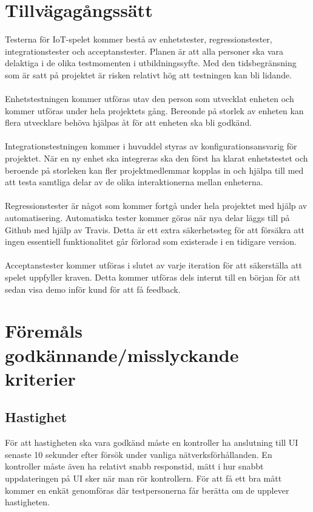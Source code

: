 \documentclass[10pt]{article}
\begin{document}
\section{Tillvägagångssätt}
	Testerna för IoT-spelet kommer bestå av enhetstester, regressionstester, integrationstester och acceptanstester. Planen är att alla personer ska vara delaktiga i de olika 		testmomenten i utbildningssyfte. Med den tidsbegränsning som är satt på projektet är risken relativt hög att testningen kan bli lidande. \\
	\\
	Enhetstestningen kommer utföras utav den person som utvecklat enheten och kommer utföras under hela projektets gång. Bereonde på storlek av enheten kan flera utvecklare behöva hjälpas åt för att enheten ska bli godkänd.\\
	\\
	Integrationstestningen kommer i huvuddel styras av konfigurationsansvarig för projektet. När en ny enhet ska integreras ska den först ha klarat enhetstestet och beroende på storleken kan fler projektmedlemmar kopplas in och hjälpa till med att testa samtliga delar av de olika interaktionerna mellan enheterna. \\
	\\
	Regressionstester är något som kommer fortgå under hela projektet med hjälp av automatisering. Automatiska tester kommer göras när nya delar läggs till på Github med hjälp av {\color{red}Travis}. Detta är ett extra säkerhetssteg för att försäkra att ingen essentiell funktionalitet går förlorad som existerade i en tidigare version.\\
	\\
	Acceptanstester kommer utföras i slutet av varje iteration för att säkerställa att spelet uppfyller kraven. Detta kommer utföras dels internt till en början för att sedan visa demo inför kund för att få feedback. 
	
	

\section{Föremåls godkännande/misslyckande kriterier}
	\subsection{Hastighet}
		För att hastigheten ska vara godkänd måste en kontroller ha anslutning till UI senaste 10 sekunder efter försök under vanliga nätverksförhållanden. En kontroller måste även ha relativt snabb responstid, mätt i hur snabbt uppdateringen på UI sker när man rör kontrollern. För att få ett bra mått kommer en enkät genomföras där testpersonerna får berätta om de upplever hastigheten.
\end{document}
